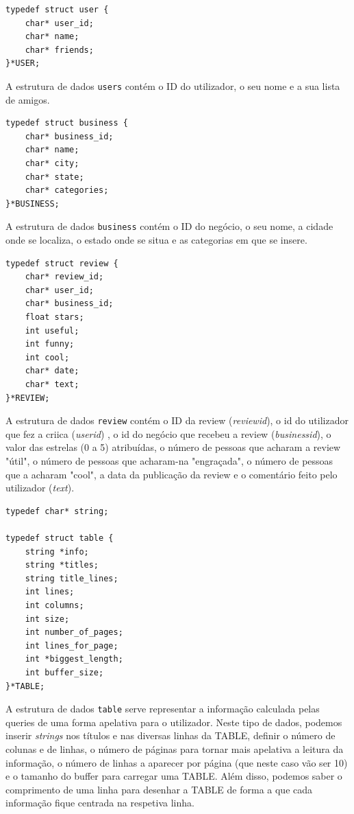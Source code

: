 \documentclass[a4paper]{article}
\begin{document}
\begin{verbatim}
typedef struct user {
    char* user_id;  
    char* name;     
    char* friends;  
}*USER;
\end{verbatim}

A estrutura de dados \texttt{users} contém o ID do utilizador, o seu nome e a sua lista de amigos. 


\begin{verbatim}
typedef struct business {
    char* business_id;  
    char* name;         
    char* city;         
    char* state;        
    char* categories;   
}*BUSINESS;
\end{verbatim}

A estrutura de dados \texttt{business} contém o ID do negócio, o seu nome, a cidade onde se localiza, o estado onde se situa
e as categorias em que se insere.

\begin{verbatim}
typedef struct review {
    char* review_id;    
    char* user_id;      
    char* business_id;  
    float stars;        
    int useful;         
    int funny;          
    int cool;           
    char* date;         
    char* text;         
}*REVIEW;
\end{verbatim}

A estrutura de dados \texttt{review} contém o ID da review (\textit{review\textunderscore id}), o id do utilizador que fez a criica (\textit{user\textunderscore id})
, o id do negócio que recebeu a review (\textit{business\textunderscore id}), o
valor das estrelas (0 a 5) atribuídas, o número de pessoas que 
acharam a review "útil", o número de pessoas que acharam-na "engraçada", o número de pessoas que a acharam "cool", a data da publicação da review e o comentário feito pelo utilizador (\textit{text}).


\begin{verbatim}
typedef char* string;

typedef struct table {
    string *info;         
    string *titles;       
    string title_lines;   
    int lines;            
    int columns;          
    int size;             
    int number_of_pages;  
    int lines_for_page;   
    int *biggest_length;  
    int buffer_size;      
}*TABLE;
\end{verbatim}

A estrutura de dados \texttt{table} serve representar a informação calculada pelas queries de uma forma apelativa para o utilizador.
Neste tipo de dados, podemos inserir \textit{strings} nos títulos e nas diversas linhas da TABLE, definir o número de colunas e de linhas, o número de páginas para tornar mais apelativa a leitura da informação, 
o número de linhas a aparecer por página (que neste caso vão ser 10) 
e o tamanho do buffer para carregar uma TABLE.
Além disso, podemos saber o comprimento de uma linha para desenhar a TABLE de forma a 
que cada informação fique centrada na respetiva linha.
\end{document}
